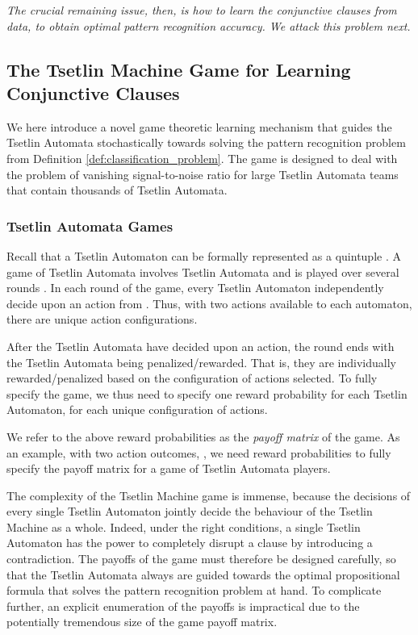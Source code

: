 \documentclass[11pt,a4paper]{article}
\begin{document}
\emph{The crucial remaining issue, then, is how to learn the conjunctive clauses from data, to obtain optimal pattern recognition accuracy. We attack this problem next.}

\subsection{The Tsetlin Machine Game for Learning Conjunctive Clauses}
\label{sec:tsetlin_machine_game}

We here introduce a novel game theoretic learning mechanism that guides the Tsetlin Automata stochastically towards solving the pattern recognition problem from Definition \ref{def:classification_problem}. The game is designed to deal with the problem of vanishing signal-to-noise ratio for large Tsetlin Automata teams that contain thousands of Tsetlin Automata.

\subsubsection{Tsetlin Automata Games}

Recall that a Tsetlin Automaton can be formally represented as a quintuple .
A game of Tsetlin Automata involves  Tsetlin Automata and is played over several rounds \cite{Narendra1989}. In each round of the game, every Tsetlin Automaton independently decide upon an action from . Thus, with two actions available to each automaton, there are  unique action configurations.

After the Tsetlin Automata have decided upon an action, the round ends with the Tsetlin Automata being penalized/rewarded. That is, they are individually rewarded/penalized based on the configuration of actions selected. To fully specify the game, we thus need to specify one reward probability for each Tsetlin Automaton, for each unique configuration of actions.

We refer to the above reward probabilities as the \emph{payoff matrix} of the game. As an example, with two action outcomes, , we need  reward probabilities to fully specify the payoff matrix for a game of  Tsetlin Automata players.

The complexity of the Tsetlin Machine game is immense, because the decisions of every single Tsetlin Automaton jointly decide the behaviour of the Tsetlin Machine as a whole. Indeed, under the right conditions, a single Tsetlin Automaton has the power to completely disrupt a clause by introducing a contradiction. The payoffs of the game must therefore be designed carefully, so that the Tsetlin Automata always are guided towards the optimal propositional formula  that solves the pattern recognition problem at hand. To complicate further, an explicit enumeration of the payoffs is impractical due to the potentially tremendous size of the game payoff matrix.
\end{document}
